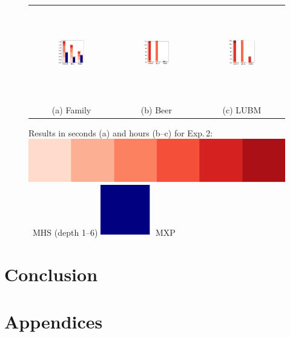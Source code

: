 \documentclass[12pt,a4paper]{article}
\begin{document}
\begin{figure}[H]
	\noindent
	\begin{tabular}{@{}c@{\ }c@{\ }c@{}}
		\includegraphics[width=0.33\textwidth, height=4cm]{eval2Family} 
		&
		\includegraphics[width=0.33\textwidth, height=4cm]{eval2Beer} 
		&
		\includegraphics[width=0.33\textwidth, height=4cm]{eval2LUBM} 
		\\
		(a) Family & (b) Beer & (c) LUBM \\
	\end{tabular}
	\caption{Results in seconds (a) and hours (b--c) for Exp.\,2:\quad
		\protect\includegraphics[height=1.5ex]{cl-mhs-scale}~MHS (depth 1--6)\quad
		\protect\includegraphics[width=1.5ex]{cl-mxp}~MXP
	}
	\label{fig:eval2}
\end{figure}


\pagebreak
\section*{Conclusion}

\pagebreak
{}



\pagebreak
\section*{Appendices}
\end{document}
